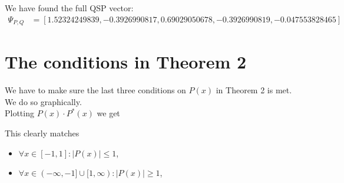 \documentclass{article}
\begin{document}
\noindent We have found the full QSP vector:
\begin{align*}
    \Psi_{P,Q} &= [1.52324249839, -0.3926990817, 0.69029050678, -0.3926990819, -0.047553828465 ]
\end{align*}

%
%


\section*{The conditions in Theorem 2}

\noindent We  have to make sure the last three conditions on $P(x)$ in Theorem 2 is met. We do so graphically.\\
\noindent Plotting $P(x)\cdot P^*(x)$ we get

\begin{center}
\end{center}

\noindent This clearly matches
\begin{itemize}
    \item $\forall x \in [-1, 1]: |P(x)| \leq 1$,
    \item $\forall x \in (-\infty, -1] \cup [1, \infty): |P(x)| \geq 1$,
\end{itemize} 
\end{document}
